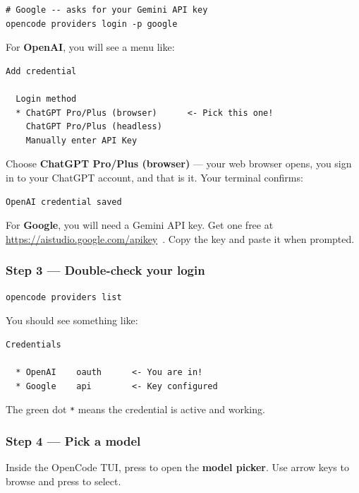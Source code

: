\documentclass[12pt]{article}
\newcommand{\key}[1]{\keystroke{#1}}
\newcommand{\keystroke}[1]{%
  \tikz[baseline=(key.base)]{%
    \node[draw, rounded corners=2pt, inner sep=2pt, fill=gray!10,
          font=\ttfamily\small] (key) {#1};%
  }%
}
\begin{document}
\begin{lstlisting}[style=term]
# Google -- asks for your Gemini API key
opencode providers login -p google
\end{lstlisting}

For \textbf{OpenAI}, you will see a menu like:

\begin{lstlisting}[style=term]
  Add credential

  Login method
  * ChatGPT Pro/Plus (browser)      <- Pick this one!
    ChatGPT Pro/Plus (headless)
    Manually enter API Key
\end{lstlisting}

Choose \textbf{ChatGPT Pro/Plus (browser)} --- your web browser opens, you sign in to your ChatGPT account, and that is it.  Your terminal confirms:

\begin{lstlisting}[style=term]
  OpenAI credential saved
\end{lstlisting}

For \textbf{Google}, you will need a Gemini API key.  Get one free at \url{https://aistudio.google.com/apikey}~\cite{google_aistudio2026}.  Copy the key and paste it when prompted.

\subsubsection*{Step 3 --- Double-check your login}

\begin{lstlisting}[style=term]
opencode providers list
\end{lstlisting}

You should see something like:

\begin{lstlisting}[style=term]
  Credentials

  * OpenAI    oauth      <- You are in!
  * Google    api        <- Key configured
\end{lstlisting}

The green dot \texttt{*} means the credential is active and working.

\subsubsection*{Step 4 --- Pick a model}

Inside the OpenCode TUI, press \key{Ctrl+O} to open the \textbf{model picker}.  Use arrow keys to browse and press \key{Enter} to select.
\end{document}
